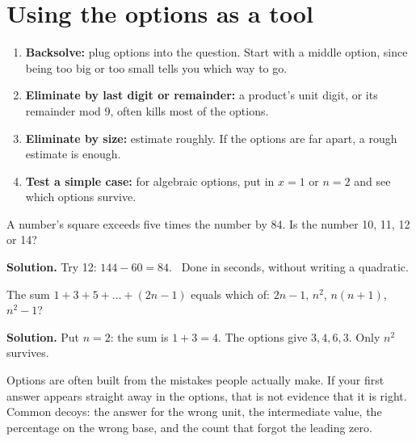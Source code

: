 \documentclass[11pt,a4paper,openany]{report}
\begin{document}
\section{Using the options as a tool}
\begin{idea}
\begin{enumerate}[nosep]
\item \textbf{Backsolve:} plug options into the question. Start with a middle option, since being too big or too small tells you which way to go.
\item \textbf{Eliminate by last digit or remainder:} a product's unit digit, or its remainder mod 9, often kills most of the options.
\item \textbf{Eliminate by size:} estimate roughly. If the options are far apart, a rough estimate is enough.
\item \textbf{Test a simple case:} for algebraic options, put in $x=1$ or $n=2$ and see which options survive.
\end{enumerate}
\end{idea}

\begin{example}[backsolving]
A number's square exceeds five times the number by 84. Is the number 10, 11, 12 or 14?

\textbf{Solution.} Try 12: $144-60=84$. \checkmark\ Done in seconds, without writing a quadratic.
\end{example}

\begin{example}
The sum $1+3+5+\dots+(2n-1)$ equals which of: $2n-1$, $n^2$, $n(n+1)$, $n^2-1$?

\textbf{Solution.} Put $n=2$: the sum is $1+3=4$. The options give $3, 4, 6, 3$. Only $n^2$ survives.
\end{example}

\begin{trap}
Options are often built from the mistakes people actually make. If your first answer appears straight away in the options, that is not evidence that it is right. Common decoys: the answer for the wrong unit, the intermediate value, the percentage on the wrong base, and the count that forgot the leading zero.
\end{trap}
\end{document}
